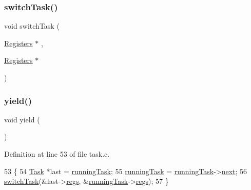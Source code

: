 \mbox{\label{a00047_a2425ca34147fccde2d1503332d21c5bd_a2425ca34147fccde2d1503332d21c5bd}} 
\subsubsection{\texorpdfstring{switch\+Task()}{switchTask()}}
{\footnotesize\ttfamily void switch\+Task (\begin{DoxyParamCaption}\item[{\hyperlink{a00130}{Registers} $\ast$}]{,  }\item[{\hyperlink{a00130}{Registers} $\ast$}]{ }\end{DoxyParamCaption})}

\mbox{\label{a00047_a58c8b2ad0ea491a6642e5e1cbd358c89_a58c8b2ad0ea491a6642e5e1cbd358c89}} 
\subsubsection{\texorpdfstring{yield()}{yield()}}
{\footnotesize\ttfamily void yield (\begin{DoxyParamCaption}{ }\end{DoxyParamCaption})}



Definition at line 53 of file task.\+c.


\begin{DoxyCode}
53              \{
54     \hyperlink{a00134}{Task} *last = \hyperlink{a00044_a2c195d425b4a6791b3a89f7b219f93d9_a2c195d425b4a6791b3a89f7b219f93d9}{runningTask};
55     \hyperlink{a00044_a2c195d425b4a6791b3a89f7b219f93d9_a2c195d425b4a6791b3a89f7b219f93d9}{runningTask} = \hyperlink{a00044_a2c195d425b4a6791b3a89f7b219f93d9_a2c195d425b4a6791b3a89f7b219f93d9}{runningTask}->\hyperlink{a00134_a8b6b50960a19f7bae344ef0cc8ec4e7d_a8b6b50960a19f7bae344ef0cc8ec4e7d}{next};
56     \hyperlink{a00047_a2425ca34147fccde2d1503332d21c5bd_a2425ca34147fccde2d1503332d21c5bd}{switchTask}(&last->\hyperlink{a00134_a136b243ee52ff89e9ba97f4e4dba19bb_a136b243ee52ff89e9ba97f4e4dba19bb}{regs}, &\hyperlink{a00044_a2c195d425b4a6791b3a89f7b219f93d9_a2c195d425b4a6791b3a89f7b219f93d9}{runningTask}->\hyperlink{a00134_a136b243ee52ff89e9ba97f4e4dba19bb_a136b243ee52ff89e9ba97f4e4dba19bb}{regs});
57 \}
\end{DoxyCode}
